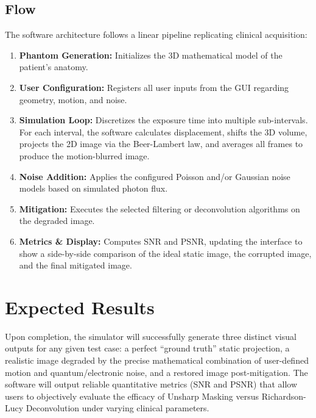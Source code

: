 \documentclass[12pt,a4paper]{article}
\begin{document}
\subsection{Flow}
The software architecture follows a linear pipeline replicating clinical acquisition:
\begin{enumerate}
    \item \textbf{Phantom Generation:} Initializes the 3D mathematical model of the patient's anatomy.
    \item \textbf{User Configuration:} Registers all user inputs from the GUI regarding geometry, motion, and noise.
    \item \textbf{Simulation Loop:} Discretizes the exposure time into multiple sub-intervals. For each interval, the software calculates displacement, shifts the 3D volume, projects the 2D image via the Beer-Lambert law, and averages all frames to produce the motion-blurred image.
    \item \textbf{Noise Addition:} Applies the configured Poisson and/or Gaussian noise models based on simulated photon flux.
    \item \textbf{Mitigation:} Executes the selected filtering or deconvolution algorithms on the degraded image.
    \item \textbf{Metrics \& Display:} Computes SNR and PSNR, updating the interface to show a side-by-side comparison of the ideal static image, the corrupted image, and the final mitigated image.
\end{enumerate}

\section{Expected Results}
Upon completion, the simulator will successfully generate three distinct visual outputs for any given test case: a perfect ``ground truth'' static projection, a realistic image degraded by the precise mathematical combination of user-defined motion and quantum/electronic noise, and a restored image post-mitigation. The software will output reliable quantitative metrics (SNR and PSNR) that allow users to objectively evaluate the efficacy of Unsharp Masking versus Richardson-Lucy Deconvolution under varying clinical parameters.
\end{document}
